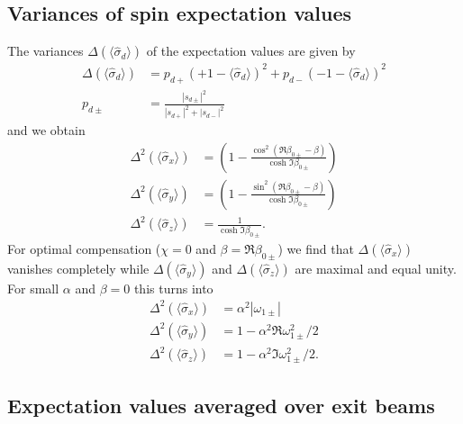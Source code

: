 \documentclass[english,keywords,aps,twocolumn]{revtex4-1}
\begin{document}
\subsection{Variances of spin expectation values} \label{app:variances}

The variances $\mathit\Delta(\langle\hat\sigma_d\rangle)$ of the expectation values are given by 
\begin{subequations}
\begin{alignat}{1}
\mathit\Delta(\langle\hat\sigma_d\rangle) &= p_{d+} (+1 - \langle\hat\sigma_d\rangle)^2 + p_{d-} (-1 - \langle\hat\sigma_d\rangle)^2\\
p_{d\pm}&=  \frac{ |s_{d\pm}|^2 }
  {|s_{d+}|^2+|s_{d-}|^2}
\end{alignat}
\end{subequations}
and we obtain
\begin{subequations}
\begin{alignat}{1}
\mathit\Delta^2(\langle \hat \sigma_x \rangle) &= 
  \left( 1 - \frac {\cos^2 (\Re\beta_{0\pm}-\beta)}{\cosh \Im \beta_{0\pm}}\right)  \\
\mathit\Delta^2(\langle \hat \sigma_y \rangle) &= 
  \left( 1 - \frac {\sin^2 (\Re\beta_{0\pm}-\beta)}{\cosh \Im \beta_{0\pm}}\right)  \\
\mathit\Delta^2(\langle \hat \sigma_z \rangle) &=
  \frac 1 {\cosh \Im \beta_{0\pm}}.
\end{alignat}
\end{subequations} 
For optimal compensation ($\chi=0$ and $\beta=\Re\beta_{0\pm}$) we find that  $\mathit\Delta(\langle \hat \sigma_x \rangle)$ vanishes completely while $\mathit\Delta(\langle \hat \sigma_y \rangle)$ and $\mathit\Delta(\langle \hat \sigma_z \rangle)$ are maximal and equal unity.
For small $\alpha$ and $\beta=0$ this turns into
\begin{subequations}
\begin{alignat}{1}
\mathit\Delta^2(\langle \hat \sigma_x \rangle) &= 
  \alpha^2 |\omega_{1\pm}| \\
\mathit\Delta^2(\langle \hat \sigma_y \rangle) &= 
  1- \alpha^2 \Re\omega_{1\pm}^2 /2\\
\mathit\Delta^2(\langle \hat \sigma_z \rangle) &=
  1- \alpha^2 \Im\omega_{1\pm}^2 /2.
\end{alignat}
\end{subequations} 


\subsection{Expectation values averaged over exit beams} \label{app:averaged}
\end{document}
